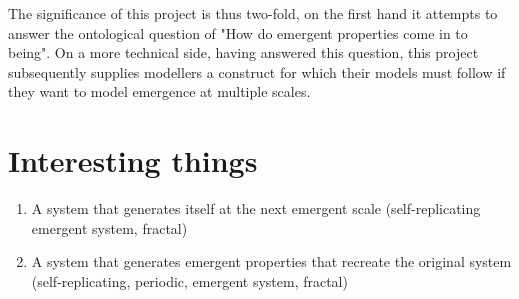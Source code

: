\documentclass{article}
\begin{document}
  The significance of this project is thus two-fold, on the first hand it attempts to answer the ontological question of "How do emergent properties come in to being". On a more technical side, having answered this question, this project subsequently supplies modellers a construct for which their models must follow if they want to model emergence at multiple scales.


\section{Interesting things}

  \begin{enumerate}[label=\textbf{\alph*)}]
    \item A system that generates itself at the next emergent scale (self-replicating emergent system, fractal)
    \item A system that generates emergent properties that recreate the original system (self-replicating, periodic, emergent system, fractal)
  \end{enumerate}
\end{document}
